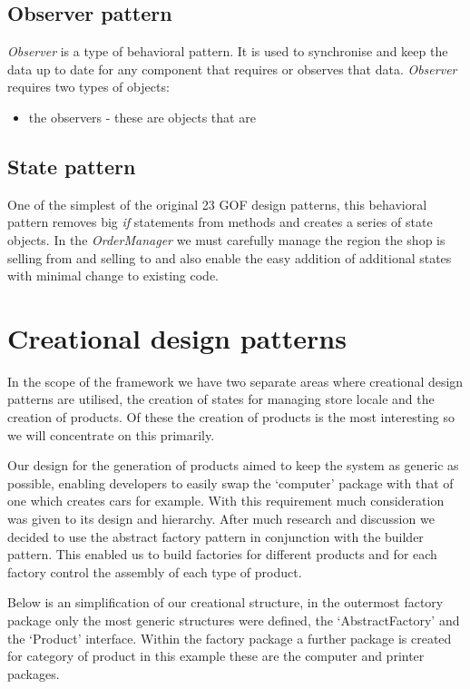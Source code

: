 \documentclass[pdftex,11pt,a4paper]{article}
\begin{document}
\subsection{Observer pattern}
\emph{Observer} is a type of behavioral pattern. It is used to synchronise and keep the data up to date for any component that requires or observes that data. \emph{Observer} requires two types of objects:
\begin{itemize}
	\item the observers - these are objects that are 
\end{itemize}
\subsection{State pattern}
One of the simplest of the original 23 GOF design patterns, this behavioral pattern removes big \emph{if} statements from methods and creates a series of state objects. In the \emph{OrderManager} we must carefully manage the region the shop is selling from and selling to and also enable the easy addition of additional states with minimal change to existing code. 

\pagebreak

\section{Creational design patterns}
In the scope of the framework we have two separate areas where creational design patterns are utilised, the creation of states for managing store locale and the creation of products. Of these the creation of products is the most interesting so we will concentrate on this primarily.

Our design for the generation of products aimed to keep the system as generic as possible, enabling developers to easily swap the ‘computer’ package with that of one which creates cars for example. With this requirement much consideration was given to its design and hierarchy. After much research and discussion we decided to use the abstract factory pattern in conjunction with the builder pattern. This enabled us to build factories for different products and for each factory control the assembly of each type of product.

Below is an simplification of our creational structure, in the outermost factory package only the most generic structures were defined, the ‘AbstractFactory’ and the ‘Product’ interface. Within the factory package a further package is created for category of product in this example these are the computer and printer packages.
\end{document}
